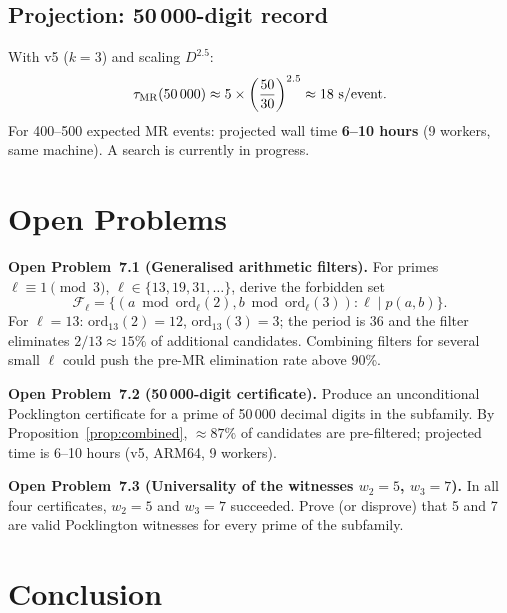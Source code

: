 \documentclass[11pt,a4paper]{article}
\theoremstyle{plain}
\theoremstyle{definition}
\begin{document}
\subsection{Projection: 50\,000-digit record}
\label{sec:projection}

With v5 ($k = 3$) and scaling $D^{2.5}$:
\[
\tau_{\rm MR}(50\,000) \approx 5 \times \left(\frac{50}{30}\right)^{2.5}
\approx 18\ \text{s/event}.
\]
For 400--500 expected MR events: projected wall time \textbf{6--10 hours}
(9 workers, same machine). A search is currently in progress.

\section{Open Problems}
\label{sec:openpb}

\begin{openproblem}
\textbf{Open Problem~7.1 (Generalised arithmetic filters).}
For primes $\ell \equiv 1 \pmod{3}$, $\ell \in \{13, 19, 31, \ldots\}$, derive
the forbidden set
\[
\mathcal{F}_\ell = \bigl\{(a \bmod \mathrm{ord}_\ell(2),
b \bmod \mathrm{ord}_\ell(3)) : \ell \mid p(a, b)\bigr\}.
\]
For $\ell = 13$: $\mathrm{ord}_{13}(2) = 12$, $\mathrm{ord}_{13}(3) = 3$;
the period is 36 and the filter eliminates $2/13 \approx 15\%$ of additional
candidates. Combining filters for several small $\ell$ could push the pre-MR
elimination rate above 90\%.
\end{openproblem}

\begin{openproblem}
\textbf{Open Problem~7.2 (50\,000-digit certificate).}
Produce an unconditional Pocklington certificate for a prime of 50\,000
decimal digits in the subfamily. By Proposition~\ref{prop:combined},
$\approx 87\%$ of candidates are pre-filtered; projected time is 6--10
hours (v5, ARM64, 9 workers).
\end{openproblem}

\begin{openproblem}\label{op:witnesses}
\textbf{Open Problem~7.3 (Universality of the witnesses $w_2 = 5$, $w_3 = 7$).}
In all four certificates, $w_2 = 5$ and $w_3 = 7$ succeeded. Prove (or
disprove) that 5 and 7 are valid Pocklington witnesses for every prime of
the subfamily.
\end{openproblem}

\section{Conclusion}
\label{sec:conclusion}
\end{document}
